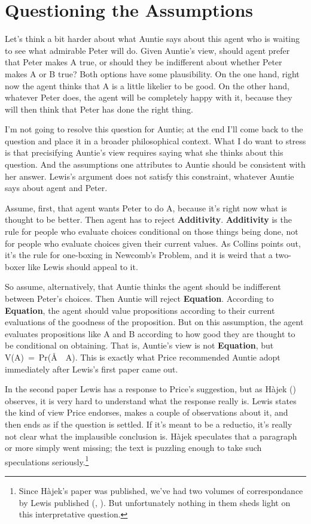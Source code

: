 \documentclass[
  10pt,
  letterpaper,
  DIV=11,
  numbers=noendperiod,
  twoside]{scrartcl}
\begin{document}
\section{Questioning the Assumptions}\label{questioning-the-assumptions}

Let's think a bit harder about what Auntie says about this agent who is
waiting to see what admirable Peter will do. Given Auntie's view, should
agent prefer that Peter makes A true, or should they be indifferent
about whether Peter makes A or B true? Both options have some
plausibility. On the one hand, right now the agent thinks that A is a
little likelier to be good. On the other hand, whatever Peter does, the
agent will be completely happy with it, because they will then think
that Peter has done the right thing.

I'm not going to resolve this question for Auntie; at the end I'll come
back to the question and place it in a broader philosophical context.
What I do want to stress is that precisifying Auntie's view requires
saying what she thinks about this question. And the assumptions one
attributes to Auntie should be consistent with her answer. Lewis's
argument does not satisfy this constraint, whatever Auntie says about
agent and Peter.

Assume, first, that agent wants Peter to do A, because it's right now
what is thought to be better. Then agent has to reject
\textbf{Additivity}. \textbf{Additivity} is the rule for people who
evaluate choices conditional on those things being done, not for people
who evaluate choices given their current values. As Collins points out,
it's the rule for one-boxing in Newcomb's Problem, and it is weird that
a two-boxer like Lewis should appeal to it.

So assume, alternatively, that Auntie thinks the agent should be
indifferent between Peter's choices. Then Auntie will reject
\textbf{Equation}. According to \textbf{Equation}, the agent should
value propositions according to their current evaluations of the
goodness of the proposition. But on this assumption, the agent evaluates
propositions like A and B according to how good they are thought to be
conditional on obtaining. That is, Auntie's view is not
\textbf{Equation}, but V(A)~=~Pr(Å~\textbar~A). This is exactly what
Price recommended Auntie adopt immediately after Lewis's first paper
came out.

In the second paper Lewis has a response to Price's suggestion, but as
Hàjek () observes, it is very hard to
understand what the response really is. Lewis states the kind of view
Price endorses, makes a couple of observations about it, and then ends
as if the question is settled. If it's meant to be a reductio, it's
really not clear what the implausible conclusion is. Hàjek speculates
that a paragraph or more simply went missing; the text is puzzling
enough to take such speculations seriously.\footnote{Since Hàjek's paper
  was published, we've had two volumes of correspondance by Lewis
  published (,
  ). But unfortunately nothing in
  them sheds light on this interpretative question.}
\end{document}
